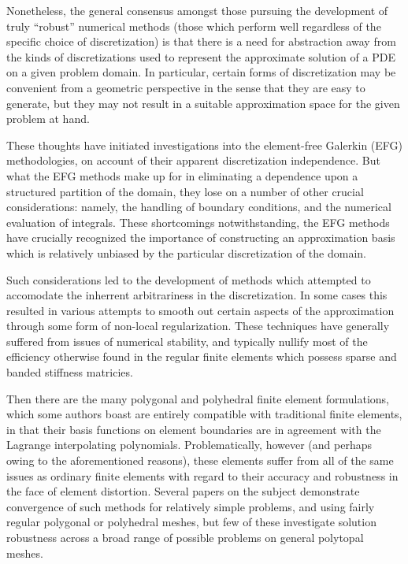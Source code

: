 Nonetheless, the general consensus amongst those pursuing the development of truly ``robust'' numerical methods (those which perform well regardless of the specific choice of discretization) is that there is a need for abstraction away from the kinds of discretizations used to represent the approximate solution of a PDE on a given problem domain. In particular, certain forms of discretization may be convenient from a geometric perspective in the sense that they are easy to generate, but they may not result in a suitable approximation space for the given problem at hand.

These thoughts have initiated investigations into the element-free Galerkin (EFG) methodologies, on account of their apparent discretization independence. But what the EFG methods make up for in eliminating a dependence upon a structured partition of the domain, they lose on a number of other crucial considerations: namely, the handling of boundary conditions, and the numerical evaluation of integrals. These shortcomings notwithstanding, the EFG methods have crucially recognized the importance of constructing an approximation basis which is relatively unbiased by the particular discretization of the domain.

Such considerations led to the development of methods which attempted to accomodate the inherrent arbitrariness in the discretization. In some cases this resulted in various attempts to smooth out certain aspects of the approximation through some form of non-local regularization. These techniques have generally suffered from issues of numerical stability, and typically nullify most of the efficiency otherwise found in the regular finite elements which possess sparse and banded stiffness matricies.

Then there are the many polygonal and polyhedral finite element formulations, which some authors boast are entirely compatible with traditional finite elements, in that their basis functions on element boundaries are in agreement with the Lagrange interpolating polynomials. Problematically, however (and perhaps owing to the aforementioned reasons), these elements suffer from all of the same issues as ordinary finite elements with regard to their accuracy and robustness in the face of element distortion. Several papers on the subject demonstrate convergence of such methods for relatively simple problems, and using fairly regular polygonal or polyhedral meshes, but few of these investigate solution robustness across a broad range of possible problems on general polytopal meshes.

